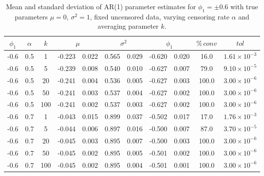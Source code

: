 \documentclass[10pt,twoside]{article}
\numberwithin{equation}{section}
\begin{document}
\begin{table}[htbp]

\begin{center}

\small

\caption{Mean and standard deviation of AR(1) parameter estimates for $\phi_1 = \pm0.6$ with true parameters $\mu=0$, $\sigma^2=1$, fixed uncensored data, varying censoring rate $\alpha$ and averaging parameter $k$.}

\label{tab:fixedAR11}

\begin{tabular}{|c|c|c|cc|cc|cc|c|c|}

\hline

$\phi_1$ & $\alpha$ & $k$ & \multicolumn{2}{c|}{$\mu$} & \multicolumn{2}{c|}{$\sigma^2$} & \multicolumn{2}{c|}{$\phi_1$} & $\%\,conv$ & $tol$ \\ \hline

-0.6 & 0.5 & 1 & -0.223 & 0.022 & 0.565 & 0.029 & -0.620 & 0.020 & 16.0 & $1.61\times10^{-3}$ \\

-0.6 & 0.5 & 5 & -0.239 & 0.008 & 0.540 & 0.010 & -0.627 & 0.007 & 79.0 & $9.10\times10^{-5}$ \\

-0.6 & 0.5 & 20 & -0.241 & 0.004 & 0.536 & 0.005 & -0.627 & 0.003 & 100.0 & $3.00\times10^{-6}$ \\

-0.6 & 0.5 & 50 & -0.241 & 0.003 & 0.537 & 0.004 & -0.627 & 0.002 & 100.0 & $3.00\times10^{-6}$ \\

-0.6 & 0.5 & 100 & -0.241 & 0.002 & 0.537 & 0.003 & -0.627 & 0.002 & 100.0 & $3.00\times10^{-6}$ \\ \hline

-0.6 & 0.7 & 1 & -0.043 & 0.015 & 0.899 & 0.037 & -0.502 & 0.017 & 17.0 & $1.76\times10^{-3}$ \\

-0.6 & 0.7 & 5 & -0.044 & 0.006 & 0.897 & 0.016 & -0.500 & 0.007 & 87.0 & $3.70\times10^{-5}$ \\

-0.6 & 0.7 & 20 & -0.045 & 0.003 & 0.895 & 0.007 & -0.500 & 0.003 & 100.0 & $3.00\times10^{-6}$ \\

-0.6 & 0.7 & 50 & -0.045 & 0.002 & 0.895 & 0.005 & -0.501 & 0.002 & 100.0 & $3.00\times10^{-6}$ \\

-0.6 & 0.7 & 100 & -0.045 & 0.002 & 0.895 & 0.004 & -0.501 & 0.001 & 100.0 & $3.00\times10^{-6}$ \\ \hline


\end{tabular}
\end{center}
\end{table}
\end{document}
